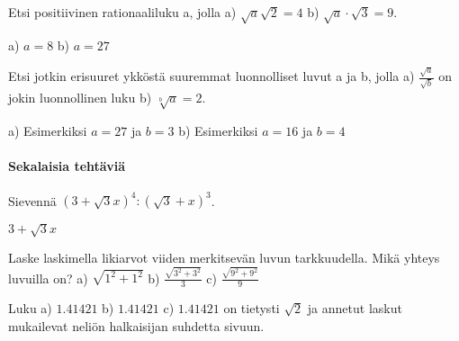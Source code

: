\begin{tehtavasivu}
\begin{tehtava}
\begin{vastaus}

\begin{alakohdat}
\end{alakohdat}
\end{vastaus}
\end{tehtava}

\begin{tehtava} Etsi positiivinen rationaaliluku a, jolla
a) $\sqrt{a} \sqrt{2} = 4$  \quad b)   $ \sqrt{a}\cdot{\sqrt{3}} =9 $.   \quad 
\begin{vastaus}
a) $a=8$ \quad b) $a=27$ \quad 
\end{vastaus}
\end{tehtava}


\begin{tehtava} Etsi jotkin erisuuret ykköstä suuremmat luonnolliset luvut a ja b, jolla 
a) $\frac{\sqrt{a}}{\sqrt{b}}$ on jokin luonnollinen luku  \quad b) $\sqrt[b]{a}=2$.   
\begin{vastaus}
a) Esimerkiksi $a=27$ \quad ja \quad $b=3$  \quad b) Esimerkiksi $a=16$ \quad ja \quad $b=4$ 
\end{vastaus}
\end{tehtava}



\paragraph*{Sekalaisia tehtäviä}

\begin{tehtava}
Sievennä $(3+\sqrt{3}x)^4:(\sqrt{3}+x)^3$.
\begin{vastaus}
$3 + \sqrt{3}x$
\end{vastaus}
\end{tehtava}



\begin{tehtava} Laske laskimella likiarvot viiden merkitsevän luvun tarkkuudella. Mikä yhteys luvuilla on?
a) $ \sqrt{1^2+1^2}$ \quad b)  $ \frac {\sqrt{3^2+3^2}}{3}$    \quad c)  $ \frac {\sqrt{9^2+9^2}}{9}$  \quad 
\begin{vastaus}
Luku a) $1.41421$ \quad b) $1.41421$ \quad c) $1.41421$ \quad on tietysti $\sqrt{2}$ ja annetut laskut mukailevat neliön halkaisijan suhdetta sivuun.
\end{vastaus}
\end{tehtava}




\end{tehtavasivu}
